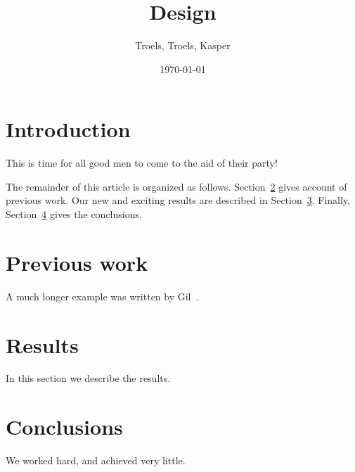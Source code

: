 \documentclass[12pt]{article}
\author{
        Troels, Troels, Kasper
}
\date{\today}
\title{Design}
\begin{document}
\maketitle

\section{Introduction}
This is time for all good men to come to the aid of their party!

The remainder of this article is organized as follows.
Section~\ref{previous work} gives account of previous work.  Our new
and exciting results are described in Section~\ref{results}.  Finally,
Section~\ref{conclusions} gives the conclusions.

\section{Previous work}\label{previous work}
A much longer \LaTeXe{} example was written by Gil~\cite{Gil:02}.

\section{Results}\label{results}
In this section we describe the results.

\section{Conclusions}\label{conclusions}
We worked hard, and achieved very little.



\end{document}
